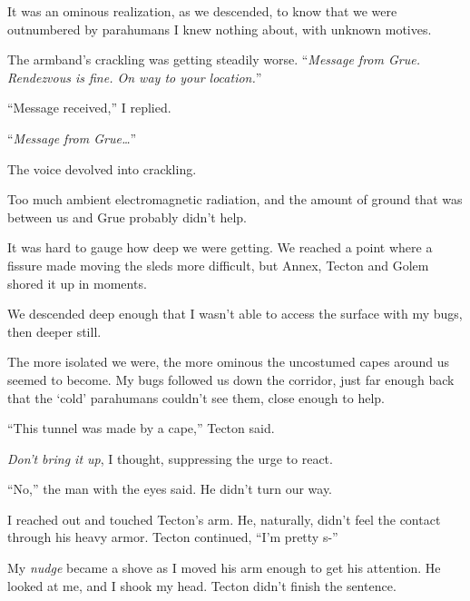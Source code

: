 It was an ominous realization, as we descended, to know that we were outnumbered by parahumans I knew nothing about, with unknown motives.



The armband's crackling was getting steadily worse.  ``\emph{Message from Grue.  Rendezvous is fine.  On way to your location.}''



``Message received,'' I replied.



``\emph{Message from Grue\ldots}''



The voice devolved into crackling.



Too much ambient electromagnetic radiation, and the amount of ground that was between us and Grue probably didn't help.



It was hard to gauge how deep we were getting.  We reached a point where a fissure made moving the sleds more difficult, but Annex, Tecton and Golem shored it up in moments.



We descended deep enough that I wasn't able to access the surface with my bugs, then deeper still.



The more isolated we were, the more ominous the uncostumed capes around us seemed to become.  My bugs followed us down the corridor, just far enough back that the `cold' parahumans couldn't see them, close enough to help.



``This tunnel was made by a cape,'' Tecton said.



\emph{Don't bring it up}, I thought, suppressing the urge to react.



``No,'' the man with the eyes said.  He didn't turn our way.



I reached out and touched Tecton's arm.  He, naturally, didn't feel the contact through his heavy armor.  Tecton continued, ``I'm pretty s-''



My \emph{nudge} became a shove as I moved his arm enough to get his attention.  He looked at me, and I shook my head.  Tecton didn't finish the sentence.




